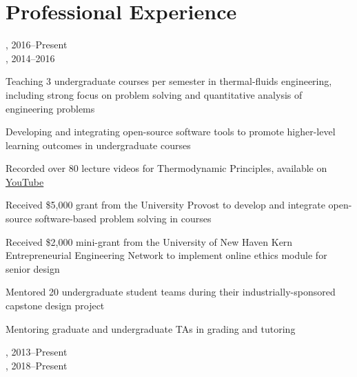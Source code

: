 \section{{\sectionfont{} Professional Experience}}

,  \hfill 2016--Present\\
,  \hfill 2014--2016

\begin{innerlist}
    \item Teaching 3 undergraduate courses per semester in thermal-fluids engineering, including strong focus on problem solving and quantitative analysis of engineering problems
    \item Developing and integrating open-source software tools to promote higher-level learning outcomes in undergraduate courses
    \item Recorded over 80 lecture videos for Thermodynamic Principles, available on \href{https://www.youtube.com/playlist?list=PLnOxmF4n89SXsKxFb6ug0ThMNpqJST5_X}{YouTube}
    \item Received \$5,000 grant from the University Provost to develop and integrate open-source software-based problem solving in courses
    \item Received \$2,000 mini-grant from the University of New Haven Kern Entrepreneurial Engineering Network to implement online ethics module for senior design
    \item Mentored 20 undergraduate student teams during their industrially-sponsored capstone design project
    \item Mentoring graduate and undergraduate TAs in grading and tutoring
\end{innerlist}

\vspace{\baselineskip}

, \href{https://github.com/Cantera/cantera}{} \hfill 2013--Present\\
,  \hfill 2018--Present

